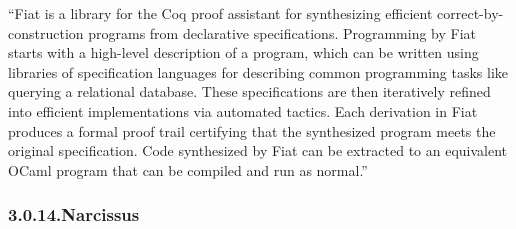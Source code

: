 \documentclass[12pt,twoside]{article}
\begin{document}
\noindent{}\textquotedblleft{}Fiat is a library for the Coq proof assistant for synthesizing
efficient correct-by-construction programs from declarative
specifications. Programming by Fiat starts with a high-level
description of a program, which can be written using libraries of
specification languages for describing common programming tasks like
querying a relational database. These specifications are then
iteratively refined into efficient implementations via automated
tactics. Each derivation in Fiat produces a formal proof trail
certifying that the synthesized program meets the original
specification. Code synthesized by Fiat can be extracted to an
equivalent OCaml program that can be compiled and run as normal.\textquotedblright{}%

\subsubsection{3.0.14.\hspace*{0.5em}Narcissus}\label{sec-narcissus}%
\end{document}
